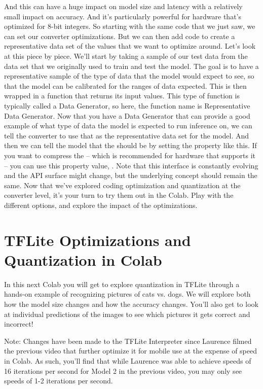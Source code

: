 And this can have a huge impact on model size and latency
with a relatively small impact on accuracy.
And it's particularly powerful for hardware
that's optimized for 8-bit integers.
So starting with the same code that we just saw,
we can set our converter optimizations.
But we can then add code to create a representative data set of the values
that we want to optimize around.
Let's look at this piece by piece.
We'll start by taking a sample of our test data
from the data set that we originally used to train and test the model.
The goal is to have a representative sample of the type of data
that the model would expect to see, so that the model can be calibrated
for the ranges of data expected.
This is then wrapped in a function that returns its input values.
This type of function is typically called a Data Generator,
so here, the function name is Representative Data Generator.
Now that you have a Data Generator that can
provide a good example of what type of data
the model is expected to run inference on,
we can tell the converter to use that as the representative
data set for the model.
And then we can tell the model that the 
should be  by setting the  property like this.
If you want to compress the  --
which is recommended for hardware that supports it --
you can use this property value, .
Note that this interface is constantly evolving
and the API surface might change, but the underlying
concept should remain the same.
Now that we've explored coding optimization and quantization
at the converter level, it's your turn to try them out in the Colab.
Play with the different options, and explore
the impact of the optimizations.

\section{TFLite Optimizations and Quantization in Colab}

In this next Colab you will get to explore quantization in TFLite through a hands-on example of recognizing pictures of cats vs. dogs. We will explore both how the model size changes and how the accuracy changes. You’ll also get to look at individual predictions of the images to see which pictures it gets correct and incorrect!

Note: Changes have been made to the TFLite Interpreter since Laurence filmed the previous video that further optimize it for mobile use at the expense of speed in Colab. As such, you'll find that while Laurence was able to achieve speeds of 16 iterations per second for Model 2 in the previous video, you may only see speeds of 1-2 iterations per second.

